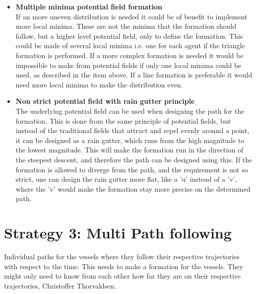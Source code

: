 \begin{itemize}
\item \textbf{Multiple minima potential field formation}\\
If an more uneven distribution is needed it could be of benefit to implement more local minima. These are not the minima that the formation should follow, but a higher level potential field, only to define the formation. This could be made of several local minima i.e. one for each agent if the triangle formation is performed. If a more complex formation is needed it would be impossible to make from potential fields if only one local minima could be used, as described in the item above. If a line formation is preferable it would need more local minima to make the distribution even.
\item \textbf{Non strict potential field with rain gutter principle}\\
The underlying potential field can be used when designing the path for the formation. This is done from the same principle of potential fields, but instead of the traditional fields that attract and repel evenly around a point, it can be designed as a rain gutter, which runs from the high magnitude to the lowest magnitude. This will make the formation run in the direction of the steepest descent, and therefore the path can be designed using this. If the formation is allowed to diverge from the path, and the requirement is not so strict, one can design the rain gutter more flat, like a 'u' instead of a 'v', where the 'v' would make the formation stay more precise on the determined path.
\end{itemize}





\section{Strategy 3: Multi Path following}
Individual paths for the vessels where they follow their respective trajectories with respect to the time. This needs to make a formation for the vessels. They might only need to know from each other how far they are on their respective trajectories, Christoffer Thorvaldsen.



